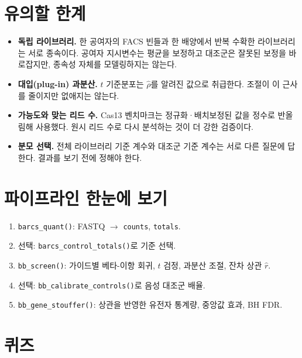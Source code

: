 \documentclass[11pt]{article}
\begin{document}
\section{유의할 한계}

\begin{itemize}[itemsep=2pt]
\item \textbf{독립 라이브러리.} 한 공여자의 FACS 빈들과 한 배양에서 반복
수확한 라이브러리는 서로 종속이다. 공여자 지시변수는 평균을 보정하고 대조군은
잘못된 보정을 바로잡지만, 종속성 자체를 모델링하지는 않는다.
\item \textbf{대입(plug-in) 과분산.} $t$ 기준분포는 $\hat\rho$를 알려진 값으로
취급한다. 조절이 이 근사를 줄이지만 없애지는 않는다.
\item \textbf{가능도와 맞는 리드 수.} Cas13 벤치마크는 정규화·배치보정된 값을
정수로 반올림해 사용했다. 원시 리드 수로 다시 분석하는 것이 더 강한 검증이다.
\item \textbf{분모 선택.} 전체 라이브러리 기준 계수와 대조군 기준 계수는 서로
다른 질문에 답한다. 결과를 보기 전에 정해야 한다.
\end{itemize}

\section{파이프라인 한눈에 보기}

\begin{enumerate}[itemsep=2pt]
\item \texttt{barcs\_quant()}: FASTQ $\rightarrow$ \texttt{counts},
\texttt{totals}.
\item 선택: \texttt{barcs\_control\_totals()}로 기준 선택.
\item \texttt{bb\_screen()}: 가이드별 베타-이항 회귀, $t$ 검정, 과분산 조절,
잔차 상관 $\hat r$.
\item 선택: \texttt{bb\_calibrate\_controls()}로 음성 대조군 배율.
\item \texttt{bb\_gene\_stouffer()}: 상관을 반영한 유전자 통계량, 중앙값 효과,
BH FDR.
\end{enumerate}

\newpage
\section{퀴즈}
\end{document}
